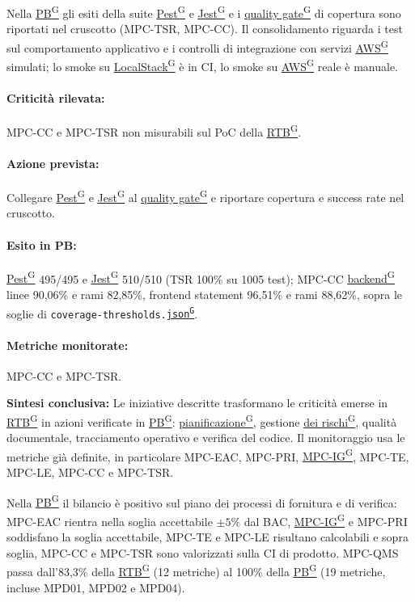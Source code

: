 \documentclass[a4paper,12pt]{article}
\providecommand{\glslink}[2]{\href{https://alittlebyte-19.github.io/Documentazione/glossario.html\#gls-#1}{\underline{#2}\textsuperscript{\scriptsize G}}}
\begin{document}
Nella \glslink{pb-product-baseline}{PB} gli esiti della suite \glslink{pest}{Pest} e \glslink{jest}{Jest} e i \glslink{quality-gate}{quality gate} di copertura sono riportati nel cruscotto (MPC-TSR, MPC-CC). Il consolidamento riguarda i test sul comportamento applicativo e i controlli di integrazione con servizi \glslink{aws}{AWS} simulati; lo smoke su \glslink{localstack}{LocalStack} è in CI, lo smoke su \glslink{aws}{AWS} reale è manuale.

\paragraph*{Criticità rilevata:} MPC-CC e MPC-TSR non misurabili sul PoC della \glslink{rtb-requirements-and-technology-baseline}{RTB}.

\paragraph*{Azione prevista:} Collegare \glslink{pest}{Pest} e \glslink{jest}{Jest} al \glslink{quality-gate}{quality gate} e riportare copertura e success rate nel cruscotto.

\paragraph*{Esito in PB:} \glslink{pest}{Pest} 495/495 e \glslink{jest}{Jest} 510/510 (TSR 100\% su 1005 test); MPC-CC \glslink{backend}{backend} linee 90,06\% e rami 82,85\%, frontend statement 96,51\% e rami 88,62\%, sopra le soglie di \texttt{coverage-thresholds.\glslink{json}{json}}.

\paragraph*{Metriche monitorate:} MPC-CC e MPC-TSR.

\bigskip

\noindent\textbf{Sintesi conclusiva:} Le iniziative descritte trasformano le criticità emerse in \glslink{rtb-requirements-and-technology-baseline}{RTB} in azioni verificate in \glslink{pb-product-baseline}{PB}: \glslink{pianificazione}{pianificazione}, gestione \glslink{mitigazione-dei-rischi}{dei rischi}, qualità documentale, tracciamento operativo e verifica del codice. Il monitoraggio usa le metriche già definite, in particolare MPC-EAC, MPC-PRI, \glslink{indice-di-gulpease-mpc-ig}{MPC-IG}, MPC-TE, MPC-LE, MPC-CC e MPC-TSR.

Nella \glslink{pb-product-baseline}{PB} il bilancio è positivo sul piano dei processi di fornitura e di verifica: MPC-EAC rientra nella soglia accettabile $\pm 5\%$ dal BAC, \glslink{indice-di-gulpease-mpc-ig}{MPC-IG} e MPC-PRI soddisfano la soglia accettabile, MPC-TE e MPC-LE risultano calcolabili e sopra soglia, MPC-CC e MPC-TSR sono valorizzati sulla CI di prodotto. MPC-QMS passa dall'83,3\% della \glslink{rtb-requirements-and-technology-baseline}{RTB} (12 metriche) al 100\% della \glslink{pb-product-baseline}{PB} (19 metriche, incluse MPD01, MPD02 e MPD04).
\end{document}
